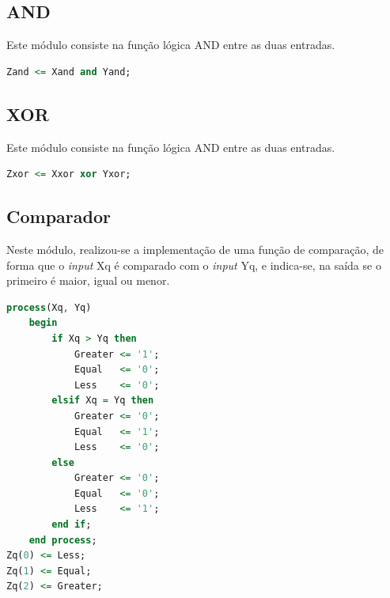 \documentclass[a4paper, 12pt]{article}
\begin{document}
\subsection{AND}
Este módulo consiste na função lógica AND entre as duas entradas.
\begin{lstlisting}[language=VHDL]
Zand <= Xand and Yand;
\end{lstlisting}

\subsection{XOR}
Este módulo consiste na função lógica AND entre as duas entradas.
\begin{lstlisting}[language=VHDL]
Zxor <= Xxor xor Yxor;
\end{lstlisting}

\subsection{Comparador}
Neste módulo, realizou-se a implementação de uma função de comparação, de forma que o \textit{input} Xq é comparado com o \textit{input} Yq, e indica-se, na saída se o primeiro é maior, igual ou menor.

\begin{lstlisting}[language=VHDL]
process(Xq, Yq)
    begin
        if Xq > Yq then
            Greater <= '1';
            Equal   <= '0';
            Less    <= '0';
        elsif Xq = Yq then
            Greater <= '0';
            Equal   <= '1';
            Less    <= '0';
        else
            Greater <= '0';
            Equal   <= '0';
            Less    <= '1';
        end if;
    end process;
Zq(0) <= Less;
Zq(1) <= Equal;
Zq(2) <= Greater;
\end{lstlisting}
\end{document}
